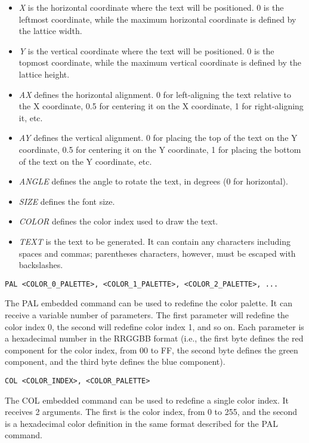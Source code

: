 \documentclass[a4paper]{article}
\begin{document}
\begin{itemize}
  \item \textit{X} is the horizontal coordinate where the text will be positioned. 0 is the leftmost coordinate, while the maximum horizontal coordinate is defined by the lattice width.
  \item \textit{Y} is the vertical coordinate where the text will be positioned. 0 is the topmost coordinate, while the maximum vertical coordinate is defined by the lattice height.
  \item \textit{AX} defines the horizontal alignment. 0 for left-aligning the text relative to the X coordinate, 0.5 for centering it on the X coordinate, 1 for right-aligning it, etc.
  \item \textit{AY} defines the vertical alignment. 0 for placing the top of the text on the Y coordinate, 0.5 for centering it on the Y coordinate, 1 for placing the bottom of the text on the Y coordinate, etc.
  \item \textit{ANGLE} defines the angle to rotate the text, in degrees (0 for horizontal).
  \item \textit{SIZE} defines the font size.
  \item \textit{COLOR} defines the color index used to draw the text.
  \item \textit{TEXT} is the text to be generated. It can contain any characters including spaces and commas; parentheses characters, however, must be escaped with backslashes.
\end{itemize} 
\bigbreak\bigbreak

\texttt{PAL <COLOR\_0\_PALETTE>, <COLOR\_1\_PALETTE>, <COLOR\_2\_PALETTE>, ...}
\bigbreak

The PAL embedded command can be used to redefine the color palette. It can receive a variable number of parameters. The first parameter will redefine the color index 0, the second will redefine color index 1, and so on. Each parameter is a hexadecimal number in the RRGGBB format (i.e., the first byte defines the red component for the color index, from 00 to FF, the second byte defines the green component, and the third byte defines the blue component).
\bigbreak\bigbreak

\texttt{COL <COLOR\_INDEX>, <COLOR\_PALETTE>}
\bigbreak

The COL embedded command can be used to redefine a single color index. It receives 2 arguments. The first is the color index, from 0 to 255, and the second is a hexadecimal color definition in the same format described for the PAL command.
\bigbreak\bigbreak
\end{document}
